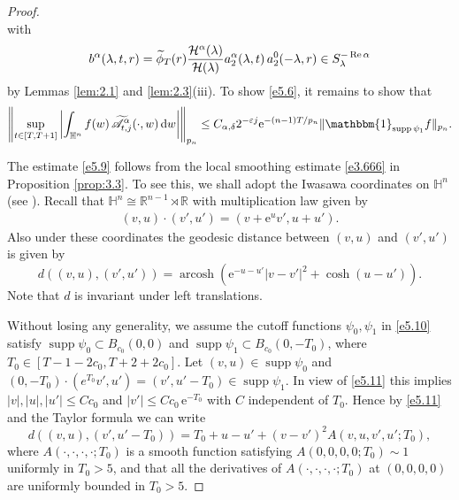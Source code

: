 \documentclass[11pt]{amsproc}
\newcommand{\R}{\mathbb{R}}
\newcommand{\e}{\mathrm{e}}
\newcommand{\indicator}{\mathbbm{1}}
\newcommand{\supp}{\mathop{\mathrm{supp}}}
\newcommand{\arcosh}{\mathop{\mathrm{arcosh}}}
\newcommand{\0}{\mathbf{0}}
\newcommand{\CK}{\mathscr{A}}
\newcommand{\bc}{{ \mathcal{H} }}
\renewcommand{\Re}{\mathop{\mathrm{Re}}}
\renewcommand{\H}{\mathbb{H}}
\renewcommand{\d}{\mathrm{d}}
\numberwithin{equation}{section}
\numberwithin{figure}{section}
\theoremstyle{definition}
\theoremstyle{remark}
\numberwithin{thm}{section}
\begin{document}
\begin{proof}
\begin{equation}
\end{equation}
with
\begin{eqnarray}\label{e4.25.1}
b^\alpha(\lambda,t,r)=\widetilde{\phi}_T(r){\bc^\alpha(\lambda)\over \bc(\lambda)}a_2^\alpha(\lambda,t)\,a_2^0(-\lambda,r)\in S^{-\Re\alpha}_\lambda
\end{eqnarray}
by Lemmas \ref{lem:2.1} and \ref{lem:2.3}(iii). To show \eqref{e5.6}, it remains to show that
\begin{equation}\label{e5.9}
\left\|\sup_{t\in[T,T+1]}\left|\int_{\H^n}f(w)\,\widetilde{\CK}^\alpha_{t,j}(\cdot,w)\,\d w\right|\right\|_{p_n}\leq C_{\alpha,\delta}2^{-\varepsilon j}\e^{-(n-1)T/p_n}\|\indicator_{\supp \psi_1}f\|_{p_n}.
\end{equation}


The estimate \eqref{e5.9} follows from the local smoothing estimate \eqref{e3.666} in Proposition \ref{prop:3.3}. To see this, we shall adopt the Iwasawa coordinates on $\H^n$ (see \cite[p. 294]{Io}). Recall that $\H^n\cong\R^{n-1}\rtimes \R$ with multiplication law given by
\begin{eqnarray*}
(v,u)\cdot(v',u')=(v+\e^u v',u+u').
\end{eqnarray*}
Also under these coordinates the geodesic distance between $(v,u)$ and $(v',u')$ is given by
\begin{equation}\label{e5.11}
d((v,u),(v',u'))=\arcosh (\e^{-u-u'}|v-v'|^2+\cosh (u-u')).
\end{equation}
Note that $d$ is invariant under left translations.

Without losing any generality, we assume the cutoff functions $\psi_0,\psi_1$ in \eqref{e5.10} satisfy $\supp\psi_0\subset B_{c_0}(0,0)$ and $\supp\psi_1\subset B_{c_0}(0,-T_0)$, where $T_0\in[T-1-2c_0,T+2+2c_0]$. Let $(v,u)\in\supp\psi_0$ and $(0,-T_0)\cdot(e^{T_0}v',u')=(v',u'-T_0)\in\supp\psi_1$. In view of \eqref{e5.11} this implies $|v|,|u|,|u'|\leq Cc_0$ and $|v'|\leq Cc_0\,\e^{-T_0}$ with $C$ independent of $T_0$. Hence by \eqref{e5.11} and the Taylor formula we can write
\begin{equation}\label{e5.12}
d((v,u),(v',u'-T_0))=T_0+u-u'+(v-v')^2 A(v,u,v',u';T_0),
\end{equation}
where $A(\cdot,\cdot,\cdot,\cdot;T_0)$ is a smooth function satisfying $A(0,0,0,0;T_0)\sim 1$ uniformly in $T_0>5$, and that all the derivatives of $A(\cdot,\cdot,\cdot,\cdot;T_0)$ at $(0,0,0,0)$ are uniformly bounded in $T_0>5$.


\end{proof}
\end{document}
